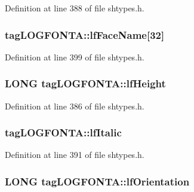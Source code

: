 Definition at line 388 of file shtypes.\+h.

\subsubsection[{\texorpdfstring{lf\+Face\+Name}{lfFaceName}}]{ tag\+L\+O\+G\+F\+O\+N\+T\+A\+::lf\+Face\+Name\mbox{[}32\mbox{]}}\hypertarget{structtag_l_o_g_f_o_n_t_a_ab243e85abc72f342dfc06b93648393f8}{}\label{structtag_l_o_g_f_o_n_t_a_ab243e85abc72f342dfc06b93648393f8}


Definition at line 399 of file shtypes.\+h.

\subsubsection[{\texorpdfstring{lf\+Height}{lfHeight}}]{\setlength{\rightskip}{0pt plus 5cm}L\+O\+NG tag\+L\+O\+G\+F\+O\+N\+T\+A\+::lf\+Height}\hypertarget{structtag_l_o_g_f_o_n_t_a_a85e64f1fe48a7683d20033139a94c78f}{}\label{structtag_l_o_g_f_o_n_t_a_a85e64f1fe48a7683d20033139a94c78f}


Definition at line 386 of file shtypes.\+h.

\subsubsection[{\texorpdfstring{lf\+Italic}{lfItalic}}]{ tag\+L\+O\+G\+F\+O\+N\+T\+A\+::lf\+Italic}\hypertarget{structtag_l_o_g_f_o_n_t_a_a9ff6272dec9cbd7f3ca16d921f0f1041}{}\label{structtag_l_o_g_f_o_n_t_a_a9ff6272dec9cbd7f3ca16d921f0f1041}


Definition at line 391 of file shtypes.\+h.

\subsubsection[{\texorpdfstring{lf\+Orientation}{lfOrientation}}]{\setlength{\rightskip}{0pt plus 5cm}L\+O\+NG tag\+L\+O\+G\+F\+O\+N\+T\+A\+::lf\+Orientation}\hypertarget{structtag_l_o_g_f_o_n_t_a_a1f0c8507c41b12a6497097728889a13b}{}\label{structtag_l_o_g_f_o_n_t_a_a1f0c8507c41b12a6497097728889a13b}


